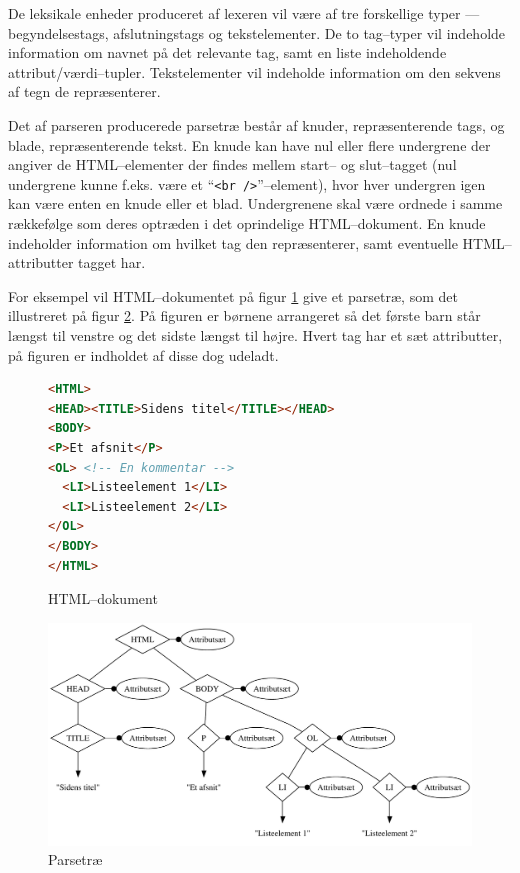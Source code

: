 \documentclass[a4paper,oneside,article]{memoir}
\begin{document}
De leksikale enheder produceret af lexeren vil være af tre forskellige
typer --- begyndelsestags, afslutningstags og tekstelementer. De to
tag--typer vil indeholde information om navnet på det relevante tag,
samt en liste indeholdende attribut/værdi--tupler. Tekstelementer vil
indeholde information om den sekvens af tegn de repræsenterer.

Det af parseren producerede parsetræ består af knuder, repræsenterende
tags, og blade, repræsenterende tekst. En knude kan have nul eller
flere undergrene der angiver de HTML--elementer der findes mellem
start-- og slut--tagget (nul undergrene kunne f.eks. være et
``\texttt{<br />}''--element), hvor hver undergren igen kan være enten
en knude eller et blad. Undergrenene skal være ordnede i samme
rækkefølge som deres optræden i det oprindelige HTML--dokument. En
knude indeholder information om hvilket tag den repræsenterer, samt
eventuelle HTML--attributter tagget har.

For eksempel vil HTML--dokumentet på figur \ref{htmldoc1} give et
parsetræ, som det illustreret på figur \ref{parsetree}. På figuren er
børnene arrangeret så det første barn står længst til venstre og det
sidste længst til højre. Hvert tag har et sæt attributter, på figuren
er indholdet af disse dog udeladt.

\begin{figure}
\begin{lstlisting}[language=HTML]
<HTML>
<HEAD><TITLE>Sidens titel</TITLE></HEAD>
<BODY>
<P>Et afsnit</P>
<OL> <!-- En kommentar -->
  <LI>Listeelement 1</LI>
  <LI>Listeelement 2</LI>
</OL>
</BODY>
</HTML>
\end{lstlisting}

  \caption{HTML--dokument}
  \label{htmldoc1}
\end{figure}

\begin{figure}
  \includegraphics[width=\textwidth]{parsetree.pdf}
  \caption{Parsetræ}
  \label{parsetree}
\end{figure}
\end{document}
